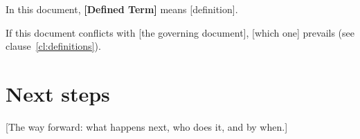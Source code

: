 \documentclass[11pt]{article}
\begin{document}
\begin{clause}
  \item {}\label{cl:definitions}
  \begin{clause}
    \item In this document, \textbf{[Defined Term]} means [definition].
  \end{clause}
  \item {}\label{cl:precedence}
  \begin{clause}
    \item If this document conflicts with [the governing document], [which one] prevails
      (see clause~\ref{cl:definitions}).
  \end{clause}
\end{clause}

\section{Next steps}

[The way forward: what happens next, who does it, and by when.]
\end{document}
